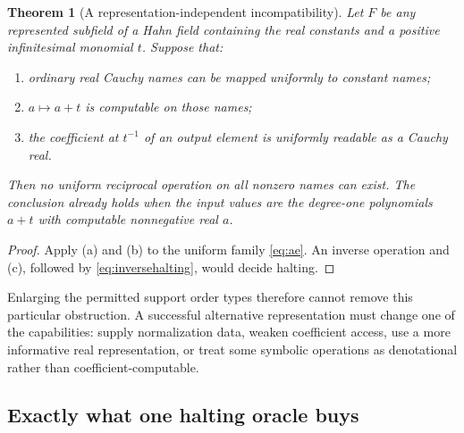 \documentclass[11pt,letterpaper]{article}
\numberwithin{equation}{section}
\newtheorem{theorem}{Theorem}[section]
\theoremstyle{definition}
\theoremstyle{remark}
\begin{document}
\begin{theorem}[A representation-independent incompatibility]
\label{thm:nogo}
Let $F$ be any represented subfield of a Hahn field containing the real
constants and a positive infinitesimal monomial $t$. Suppose that:
\begin{enumerate}[label=\textup{(\alph*)},leftmargin=2em]
\item ordinary real Cauchy names can be mapped uniformly to constant names;
\item $a\mapsto a+t$ is computable on those names;
\item the coefficient at $t^{-1}$ of an output element is uniformly
readable as a Cauchy real.
\end{enumerate}
Then no uniform reciprocal operation on all nonzero names can exist.
The conclusion already holds when the input values are the degree-one
polynomials $a+t$ with computable nonnegative real $a$.
\end{theorem}
\begin{proof}
Apply (a) and (b) to the uniform family \eqref{eq:ae}. An inverse operation
and (c), followed by \eqref{eq:inversehalting}, would decide halting.
\end{proof}

Enlarging the permitted support order types therefore cannot remove this
particular obstruction. A successful alternative representation must change
one of the capabilities: supply normalization data, weaken coefficient
access, use a more informative real representation, or treat some symbolic
operations as denotational rather than coefficient-computable.

\subsection{Exactly what one halting oracle buys}
\end{document}
